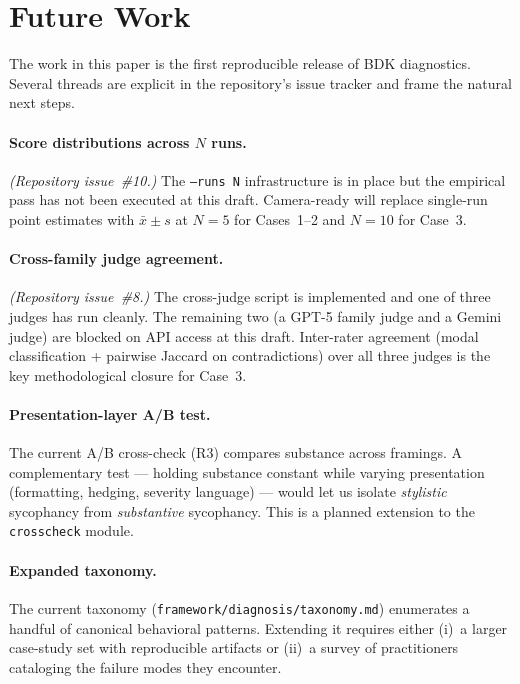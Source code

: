 \section{Future Work}
\label{sec:future}

The work in this paper is the first reproducible release of BDK diagnostics.
Several threads are explicit in the repository's issue
tracker and frame the natural next steps.

\paragraph{Score distributions across $N$ runs.}
\textit{(Repository issue~\#10.)} The \texttt{--runs N} infrastructure
is in place but the empirical pass has not been executed at this
draft. Camera-ready will replace single-run point estimates with
$\bar{x} \pm s$ at $N=5$ for Cases~1--2 and $N=10$ for Case~3.

\paragraph{Cross-family judge agreement.}
\textit{(Repository issue~\#8.)} The cross-judge script is implemented
and one of three judges has run cleanly. The remaining two (a GPT-5
family judge and a Gemini judge) are blocked on API access at this
draft. Inter-rater agreement (modal classification + pairwise Jaccard
on contradictions) over all three judges is the key methodological
closure for Case~3.

\paragraph{Presentation-layer A/B test.}
The current A/B cross-check (R3) compares substance across framings.
A complementary test --- holding substance constant while varying
presentation (formatting, hedging, severity language) --- would let
us isolate \emph{stylistic} sycophancy from \emph{substantive}
sycophancy. This is a planned extension to the \texttt{crosscheck}
module.

\paragraph{Expanded taxonomy.}
The current taxonomy (\texttt{framework/diagnosis/taxonomy.md}) enumerates a handful of
canonical behavioral patterns. Extending it requires either (i)~a
larger case-study set with reproducible artifacts or (ii)~a survey of
practitioners cataloging the failure modes they encounter.

